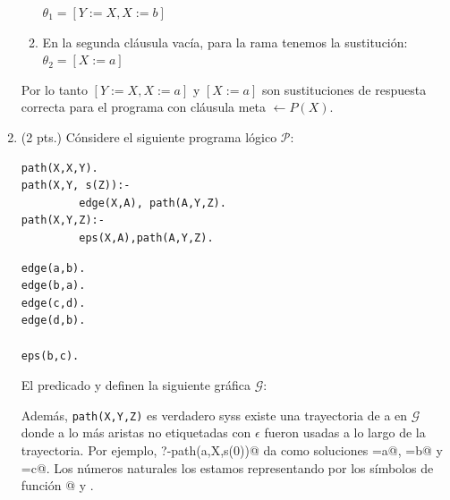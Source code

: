 \documentclass[12pt,letterpaper]{article}
\newcommand{\dmp}{\leftarrow}
\begin{document}
\begin{enumerate}
\begin{enumerate}[label=\arabic*)]
    $\theta_1 = [Y:= X, X := b]$
  \item En la segunda cl\'{a}usula vac\'{i}a, para la rama tenemos la sustitución: $\theta_2 = [X := a]$
  \end{enumerate}

  Por lo tanto $[Y := X, X := a]$ y $[X := a]$ son sustituciones de respuesta correcta para el programa con cláusula meta $\dmp P(X)$.
  \bigskip
  
\item (2 pts.) Cónsidere el siguiente programa lógico $\mathcal{P}$:
  \begin{multicols}{2}
\begin{verbatim}
path(X,X,Y).            
path(X,Y, s(Z)):-
         edge(X,A), path(A,Y,Z).
path(X,Y,Z):-
         eps(X,A),path(A,Y,Z).

\end{verbatim}
\begin{verbatim}
edge(a,b).
edge(b,a).
edge(c,d).
edge(d,b).

eps(b,c).
\end{verbatim}
  \end{multicols}
  \vspace{-0.4cm}
  El predicado \verb@edge@ y \verb@eps@ definen la siguiente gráfica $\mathcal{G}$:
  \begin{center}
  \end{center}

  Además, \verb|path(X,Y,Z)| es verdadero syss existe una trayectoria de \verb@X@ a \verb@Y@ en $\mathcal{G}$ donde a lo más \verb@Z@ aristas no etiquetadas con $\epsilon$ fueron usadas a lo largo de la trayectoria. Por ejemplo, \verb@?-path(a,X,s(0))@ da como soluciones \verb@X=a@, \verb@X=b@ y \verb@X=c@. Los números naturales los estamos representando por los símbolos de función @ y \verb@s@.


\end{enumerate}
\end{document}

